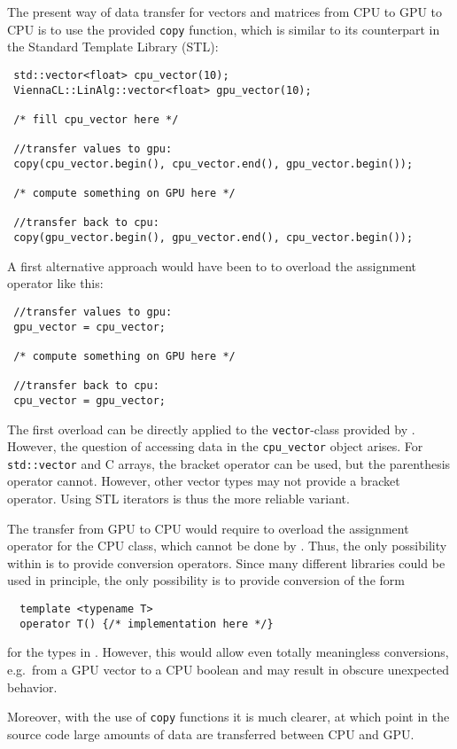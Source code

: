 The present way of data transfer for vectors and matrices from CPU to GPU to CPU
is to use the provided \lstinline|copy| function, which is similar to its
counterpart in the Standard Template Library (STL):
\begin{lstlisting}
 std::vector<float> cpu_vector(10);
 ViennaCL::LinAlg::vector<float> gpu_vector(10);

 /* fill cpu_vector here */

 //transfer values to gpu:
 copy(cpu_vector.begin(), cpu_vector.end(), gpu_vector.begin());

 /* compute something on GPU here */

 //transfer back to cpu:
 copy(gpu_vector.begin(), gpu_vector.end(), cpu_vector.begin());
\end{lstlisting}
A first alternative
approach would have been to to overload the assignment operator like this:
\begin{lstlisting}
 //transfer values to gpu:
 gpu_vector = cpu_vector;

 /* compute something on GPU here */

 //transfer back to cpu:
 cpu_vector = gpu_vector;
\end{lstlisting}
The first overload can be directly applied to the \lstinline|vector|-class
provided by \ViennaCL. However, the question of accessing data in the
\lstinline|cpu_vector| object arises. For \lstinline|std::vector| and C arrays, the bracket
operator can be used, but the parenthesis operator cannot. However, other vector types
may not provide a bracket operator. Using STL iterators is thus the more reliable variant.

The transfer from GPU to CPU would require to overload the
assignment operator for the CPU class, which cannot be done by {\ViennaCL}. Thus,
the only possibility within {\ViennaCL} is to provide conversion operators.
Since many different libraries could be used in principle, the only possibility
is to provide conversion of the form
\begin{lstlisting}
  template <typename T>
  operator T() {/* implementation here */}
\end{lstlisting}
for the types in {\ViennaCL}. However, this would allow even totally meaningless
conversions, e.g.~from a GPU vector to a CPU boolean and may result in obscure unexpected behavior.

Moreover, with the use of \texttt{copy} functions it is much clearer, at which
point in the source code large amounts of data are transferred between CPU and GPU.

